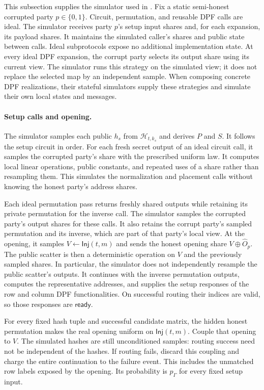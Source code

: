This subsection supplies the simulator used in
.  Fix a static semi-honest corrupted
party $p\in\{0,1\}$.  Circuit, permutation, and reusable DPF calls are ideal.
The simulator receives party $p$'s setup input shares and, for each expansion,
its payload shares. It maintains the simulated caller's shares and public
state between calls. Ideal subprotocols expose no additional implementation
state. At every ideal DPF expansion, the corrupt party selects its output
share using its current view. The simulator runs this strategy on the
simulated view; it does not replace the selected map by an independent sample.
When composing concrete DPF realizations, their stateful simulators supply
these strategies and simulate their own local states and messages.

\paragraph{Setup calls and opening.}
The simulator samples each public $h_s$ from $\mathcal H_{t,k_s}$ and derives
$P$ and $S$.  It follows the setup circuit in order.  For each fresh secret
output of an ideal circuit call, it samples the corrupted party's share with
the prescribed uniform law.  It computes local linear operations, public
constants, and repeated uses of a share rather than resampling them.
This simulates the normalization and placement calls without knowing the
honest party's address shares.

Each ideal permutation pass returns freshly shared outputs while retaining
its private permutation for the inverse call.  The simulator samples the
corrupted party's output shares for these calls. It also retains the corrupt
party's sampled permutation and its inverse, which are part of that party's
local view. At the opening, it samples
$V\gets\mathsf{Inj}(t,m)$ and sends the honest opening share
$V\oplus\widehat O_p$.  The public scatter is then a deterministic operation
on $V$ and the previously sampled shares.  In particular, the simulator
does not independently resample the public scatter's outputs.  It continues
with the inverse permutation outputs, computes the representative addresses,
and supplies the setup responses of the row and column DPF functionalities.
On successful routing their indices are valid, so those responses are
$\mathsf{ready}$.

For every fixed hash tuple and successful candidate matrix, the hidden
honest permutation makes the real opening uniform on $\mathsf{Inj}(t,m)$.
Couple that opening to $V$.  The simulated hashes are still unconditioned
samples: routing success need not be independent of the hashes.  If routing
fails, discard this coupling and charge the entire continuation to the
failure event.  This includes the unmatched row labels exposed by the opening.
Its probability is $p_\Gamma$ for every fixed setup input.

